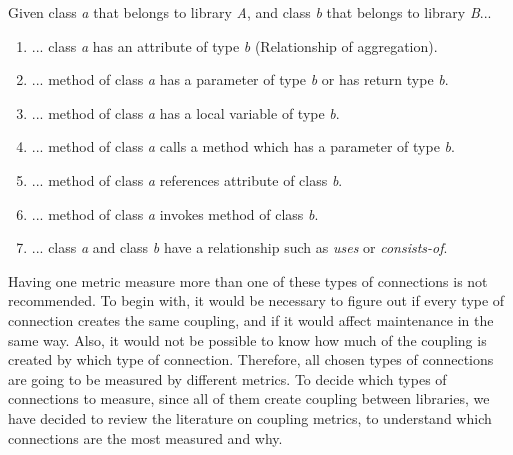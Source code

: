\documentclass[a4paper]{article}
\begin{document}
Given class \textit{a} that belongs to library \textit{A}, and class \textit{b} that belongs to library \textit{B}...

\begin{enumerate}[noitemsep,leftmargin=*]
  \item ... class \textit{a} has an attribute of type \textit{b} (Relationship of aggregation).
  \item ... method of class \textit{a} has a parameter of type \textit{b} or has return type \textit{b}.
  \item ... method of class \textit{a} has a local variable of type \textit{b}.
  \item ... method of class \textit{a} calls a method which has a parameter of type \textit{b}.
  \item ... method of class \textit{a} references attribute of class \textit{b}.
  \item ... method of class \textit{a} invokes method of class \textit{b}.
  \item ... class \textit{a} and class \textit{b} have a relationship such as \textit{uses} or \textit{consists-of}.
\end{enumerate}

Having one metric measure more than one of these types of connections is not recommended. To begin with, it would be necessary to figure out if every type of connection creates the same coupling, and if it would affect maintenance in the same way. Also, it would not be possible to know how much of the coupling is created by which type of connection. Therefore, all chosen types of connections are going to be measured by different metrics. To decide which types of connections to measure, since all of them create coupling between libraries, we have decided to review the literature on coupling metrics, to understand which connections are the most measured and why.
\end{document}
